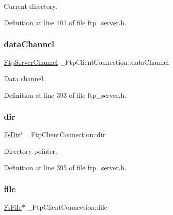 Current directory. 



Definition at line 401 of file ftp\+\_\+server.\+h.

\mbox{\label{struct__FtpClientConnection_a6f6689abb4e803f4014d41b80617c6df}} 
\subsubsection{\texorpdfstring{data\+Channel}{dataChannel}}
{\footnotesize\ttfamily \hyperlink{structFtpServerChannel}{Ftp\+Server\+Channel} \+\_\+\+Ftp\+Client\+Connection\+::data\+Channel}



Data channel. 



Definition at line 393 of file ftp\+\_\+server.\+h.

\mbox{\label{struct__FtpClientConnection_a5e2e292f7a5a4395b9831d0f0edc171d}} 
\subsubsection{\texorpdfstring{dir}{dir}}
{\footnotesize\ttfamily \hyperlink{structFsDir}{Fs\+Dir}$\ast$ \+\_\+\+Ftp\+Client\+Connection\+::dir}



Directory pointer. 



Definition at line 395 of file ftp\+\_\+server.\+h.

\mbox{\label{struct__FtpClientConnection_afa1056ae0607ea6f5db9fb377b671566}} 
\subsubsection{\texorpdfstring{file}{file}}
{\footnotesize\ttfamily \hyperlink{fs__port__fatfs_8h_a913e2a93cbf8ed241fe05fb6abc3f316}{Fs\+File}$\ast$ \+\_\+\+Ftp\+Client\+Connection\+::file}



